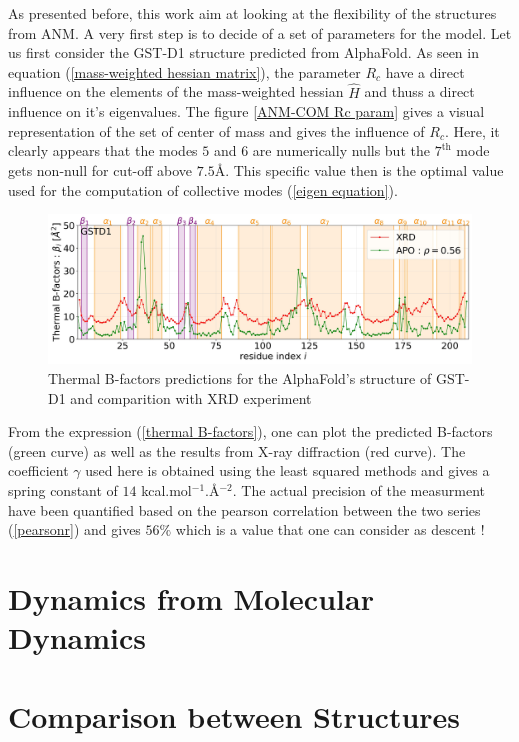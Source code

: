 \noindent As presented before, this work aim at looking at the flexibility of the structures from ANM. A very first step is to decide of a set of parameters for the model. Let us first consider the GST-D1 structure predicted from AlphaFold. As seen in equation (\ref{mass-weighted hessian matrix}), the parameter $R_c$ have a direct influence on the elements of the mass-weighted hessian $\hat{H}$ and thuss a direct influence on it's eigenvalues. The figure \ref{ANM-COM Rc param} gives a visual representation of the set of center of mass and gives the influence of $R_c$. Here, it clearly appears that the modes $5$ and $6$ are numerically nulls but the $7^{\text{th}}$ mode gets non-null for cut-off above $7.5$\AA . This specific value then is the optimal value used for the computation of collective modes (\ref{eigen equation}). 

\begin{figure}[h!]
	\label{ANM-COM Bfactors pred}
	\includegraphics[width = .99\linewidth]{figures/GSTD1_ANM-COM_Bfactors.jpg}
	\caption{Thermal B-factors predictions for the AlphaFold's structure of GST-D1 and comparition with XRD experiment}
\end{figure}

\noindent From the expression (\ref{thermal B-factors}), one can plot the predicted B-factors (green curve) as well as the results from X-ray diffraction (red curve). The coefficient $\gamma$ used here is obtained using the least squared methods and gives a spring constant of $14$ kcal.mol$^{-1}$.\AA$^{-2}$. The actual precision of the measurment have been quantified based on the pearson correlation between the two series (\ref{pearsonr}) and gives $56\%$ which is a value that one can consider as descent !
\section{Dynamics from Molecular Dynamics}

\section{Comparison between Structures}